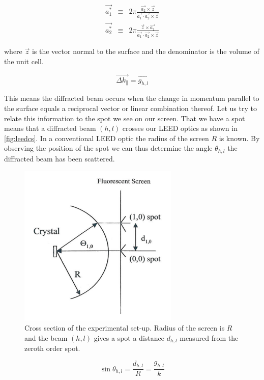 \begin{eqnarray}
\vec{a_1^*}	& \equiv	& 2\pi\frac{\vec{a_2}\times\vec{z}}{\vec{a_1}\cdot\vec{a_2}\times\vec{z}}\\
\vec{a_2^*}	& \equiv	& 2\pi\frac{\vec{z}\times\vec{a_1}}{\vec{a_1}\cdot\vec{a_2}\times\vec{z}}
\end{eqnarray}

\noindent where $\vec{z}$ is the vector normal to the surface and the denominator is the volume of the unit cell. 

\begin{equation}
\vec{\Delta k_{\parallel}}=\vec{g_{h,l}}
\end{equation}

This means the diffracted beam occurs when the change in momentum parallel to the surface equals a reciprocal vector or linear combination thereof. Let us try to relate this information to the spot we see on our screen. That we have a spot means that a diffracted beam $(h,l)$ crosses our LEED optics as shown in \autoref{fig:leedcs}. In a conventional LEED optic the radius of the screen $R$ is known. By observing the position of the spot we can thus determine the angle $\theta_{h,l}$ the diffracted beam has been scattered.

\begin{figure}[h!]
	\begin{center}
	\includegraphics[scale=4]{figures/09_09.png}
	\caption{Cross section of the experimental set-up. Radius of the screen is $R$ and the beam $(h,l)$ gives a spot a distance $d_{h,l}$ measured from the zeroth order spot.}
	\label{fig:leedcs}
	\end{center}
\end{figure}

\begin{equation}
\sin{\theta_{h,l}} = \frac{d_{h,l}}{R} = \frac{g_{h,l}}{k}
\end{equation}

